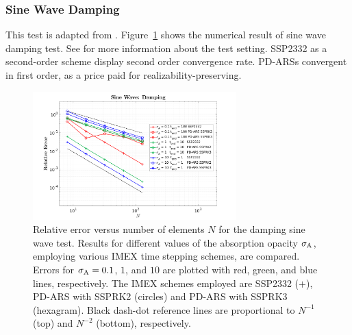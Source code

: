 \subsubsection{Sine Wave Damping}
This test is adapted from \cite{skinnerOstriker_2013}.
Figure~\ref{fig:SineWaveDamping} shows the numerical result of sine wave damping test.
See \cite{chu_etal_2018} for more information about the test setting.
SSP2332 as a second-order scheme display second order convergence rate.
PD-ARSs convergent in first order, as a price paid for realizability-preserving.
\begin{figure}[h]
  \centering
    \includegraphics[width=0.7\textwidth]{figures/SineWaveDamping}
   \caption{Relative error versus number of elements $N$ for the damping sine wave test. Results for different values of the absorption opacity $\sigma_{{\rm A}}$, employing various IMEX time stepping schemes, are compared.  Errors for $\sigma_{{\rm A}}=0.1$, $1$, and $10$ are plotted with red, green, and blue lines, respectively.  The IMEX schemes employed are SSP2332 ($+$), PD-ARS with SSPRK2 (circles) and PD-ARS with SSPRK3 (hexagram).  Black dash-dot reference lines are proportional to $N^{-1}$ (top) and $N^{-2}$ (bottom), respectively.}
  \label{fig:SineWaveDamping}
\end{figure}


